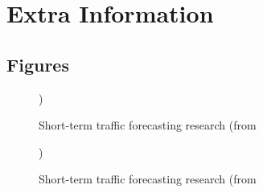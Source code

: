 \chapter{Extra Information}

\section{Figures}
\begin{figure}[h]
	\caption{Short-term traffic forecasting research (from \cite{Vlahogianni20143}})
	\label{fig:Vlahogianni201431}
\end{figure}

\begin{figure}[ht]
	\caption{Short-term traffic forecasting research (from \cite{Vlahogianni20143}})
	\label{fig:Vlahogianni201432}
\end{figure}


